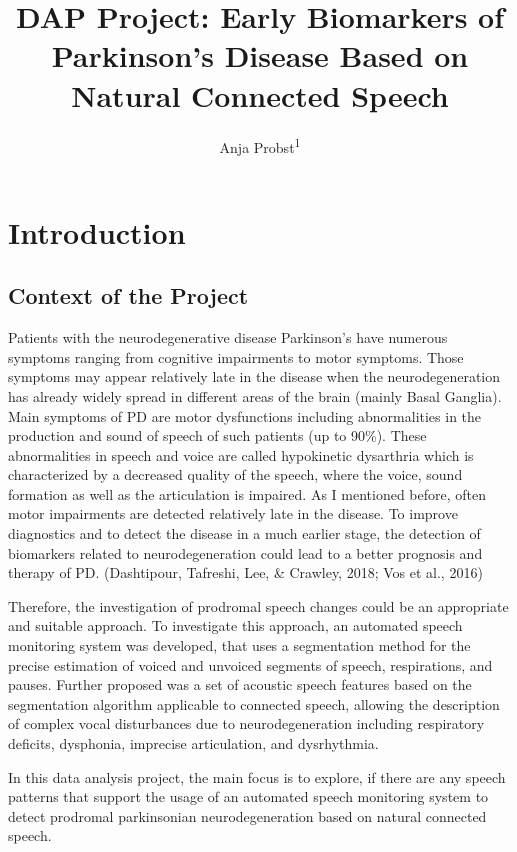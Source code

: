 \documentclass[
  english,
  doc,floatsintext]{apa6}
\title{DAP Project: Early Biomarkers of Parkinson's Disease Based on Natural Connected Speech}
\author{Anja Probst\textsuperscript{1}}
\date{}
\affiliation{\vspace{0.5cm}\textsuperscript{1} University of Geneva}
\begin{document}
\maketitle

\clearpage

\hypertarget{introduction}{%
\section{Introduction}\label{introduction}}

\hypertarget{context-of-the-project}{%
\subsection{Context of the Project}\label{context-of-the-project}}

Patients with the neurodegenerative disease Parkinson's have numerous symptoms ranging from cognitive
impairments to motor symptoms. Those symptoms may appear relatively late in the disease when the
neurodegeneration has already widely spread in different areas of the brain (mainly Basal Ganglia).
Main symptoms of PD are motor dysfunctions including abnormalities in the production and sound of
speech of such patients (up to 90\%). These abnormalities in speech and voice are called hypokinetic
dysarthria which is characterized by a decreased quality of the speech, where the voice, sound formation
as well as the articulation is impaired. As I mentioned before, often motor impairments are detected
relatively late in the disease. To improve diagnostics and to detect the disease in a much earlier stage,
the detection of biomarkers related to neurodegeneration could lead to a better prognosis and therapy of PD.
(Dashtipour, Tafreshi, Lee, \& Crawley, 2018; Vos et al., 2016)

Therefore, the investigation of prodromal speech changes could be an appropriate and suitable approach.
To investigate this approach, an automated speech monitoring system was developed, that uses a
segmentation method for the precise estimation of voiced and unvoiced segments of speech, respirations,
and pauses. Further proposed was a set of acoustic speech features based on the segmentation algorithm
applicable to connected speech, allowing the description of complex vocal disturbances due to neurodegeneration
including respiratory deficits, dysphonia, imprecise articulation, and dysrhythmia.

In this data analysis project, the main focus is to explore, if there are any speech patterns that
support the usage of an automated speech monitoring system to detect prodromal parkinsonian
neurodegeneration based on natural connected speech.
\end{document}
